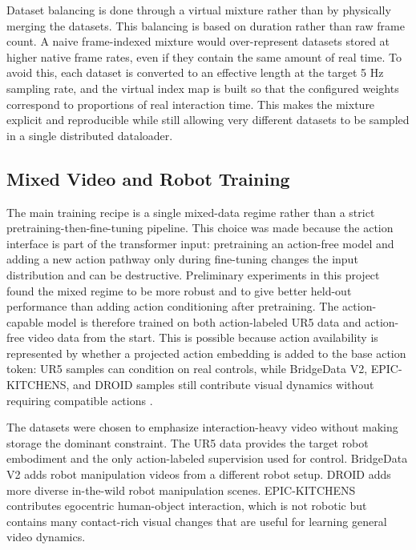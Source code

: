 \documentclass[12pt]{report}
\begin{document}
Dataset balancing is done through a virtual mixture rather than by physically merging the datasets. This balancing is based on duration rather than raw frame count. A naive frame-indexed mixture would over-represent datasets stored at higher native frame rates, even if they contain the same amount of real time. To avoid this, each dataset is converted to an effective length at the target 5 Hz sampling rate, and the virtual index map is built so that the configured weights correspond to proportions of real interaction time. This makes the mixture explicit and reproducible while still allowing very different datasets to be sampled in a single distributed dataloader.

\subsection{Mixed Video and Robot Training}
The main training recipe is a single mixed-data regime rather than a strict pretraining-then-fine-tuning pipeline. This choice was made because the action interface is part of the transformer input: pretraining an action-free model and adding a new action pathway only during fine-tuning changes the input distribution and can be destructive. Preliminary experiments in this project found the mixed regime to be more robust and to give better held-out performance than adding action conditioning after pretraining. The action-capable model is therefore trained on both action-labeled UR5 data and action-free video data from the start. This is possible because action availability is represented by whether a projected action embedding is added to the base action token: UR5 samples can condition on real controls, while BridgeData V2, EPIC-KITCHENS, and DROID samples still contribute visual dynamics without requiring compatible actions \cite{walke2023bridgedatav2,damen2022epickitchens,khazatsky2024droid}.

The datasets were chosen to emphasize interaction-heavy video without making storage the dominant constraint. The UR5 data provides the target robot embodiment and the only action-labeled supervision used for control. BridgeData V2 adds robot manipulation videos from a different robot setup. DROID adds more diverse in-the-wild robot manipulation scenes. EPIC-KITCHENS contributes egocentric human-object interaction, which is not robotic but contains many contact-rich visual changes that are useful for learning general video dynamics.
\end{document}
